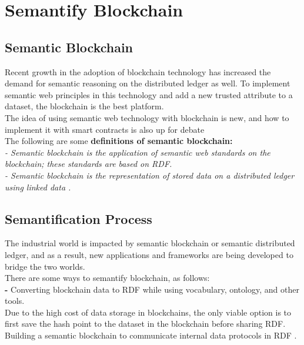 \section{Semantify Blockchain}
\subsection{Semantic Blockchain}
Recent growth in the adoption of blockchain technology has increased the demand for semantic reasoning on the distributed ledger as well. To implement semantic web principles in this technology and add a new trusted attribute to a dataset, the blockchain is the best platform. \\
The idea of using semantic web technology with blockchain is new, and how to implement it with smart contracts is also up for debate\\
The following are some \textbf{definitions of semantic  blockchain:} \\
\textit{- Semantic blockchain is the application of semantic web standards on the blockchain; these standards are based on RDF.}\\
\textit{- Semantic blockchain is the representation of stored data on a distributed ledger using linked data \cite{Hector}.}\\
\subsection{Semantification Process}
The industrial world is impacted by semantic blockchain or semantic distributed ledger, and as a result, new applications and frameworks are being developed to bridge the two worlds. \\ 
There are some ways to semantify blockchain, as follows:\\
\textbf{-} Converting blockchain data to RDF while using vocabulary, ontology, and other tools. \\
Due to the high cost of data storage in blockchains, the only viable option is to first save the hash point to the dataset in the blockchain before sharing RDF. \\
Building a semantic blockchain to communicate internal data protocols in RDF \cite{Hector}. 
